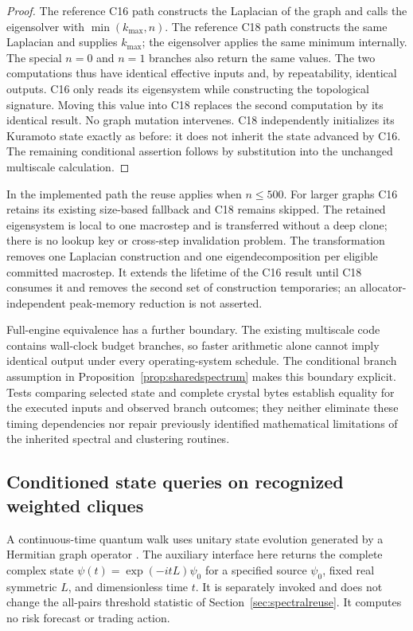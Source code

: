 \documentclass[11pt,a4paper]{article}
\theoremstyle{definition}\newtheorem{definition}[theorem]{Definition}
\begin{document}
\begin{proof}
The reference C16 path constructs the Laplacian of the graph and calls the
eigensolver with $\min(k_{\max},n)$.  The reference C18 path constructs the
same Laplacian and supplies $k_{\max}$; the eigensolver applies the same minimum
internally.  The special $n=0$ and $n=1$ branches also return the same values.
The two computations thus have identical effective inputs and, by
repeatability, identical outputs.  C16 only reads its eigensystem while
constructing the topological signature.  Moving this value into C18 replaces
the second computation by its identical result.  No graph mutation intervenes.
C18 independently initializes its Kuramoto state exactly as before: it does
not inherit the state advanced by C16.  The remaining conditional assertion
follows by substitution into the unchanged multiscale calculation.
\end{proof}

In the implemented path the reuse applies when $n\leq500$.  For larger graphs
C16 retains its existing size-based fallback and C18 remains skipped.  The
retained eigensystem is local to one macrostep and is transferred without a
deep clone; there is no lookup key or cross-step invalidation problem.  The
transformation removes one Laplacian construction and one eigendecomposition
per eligible committed macrostep.  It extends the lifetime of the C16 result
until C18 consumes it and removes the second set of construction temporaries;
an allocator-independent peak-memory reduction is not asserted.

Full-engine equivalence has a further boundary.  The existing multiscale code
contains wall-clock budget branches, so faster arithmetic alone cannot imply
identical output under every operating-system schedule.  The conditional
branch assumption in Proposition~\ref{prop:sharedspectrum} makes this boundary
explicit.  Tests comparing selected state and complete crystal bytes establish
equality for the executed inputs and observed branch outcomes; they neither
eliminate these timing dependencies nor repair previously identified
mathematical limitations of the inherited spectral and clustering routines.

\subsection{Conditioned state queries on recognized weighted cliques}
\label{sec:conditionedwalk}
A continuous-time quantum walk uses unitary state evolution generated by a
Hermitian graph operator \cite{farhigutmann1998}. The auxiliary interface here
returns the complete complex state $\psi(t)=\exp(-itL)\psi_0$ for a specified
source $\psi_0$, fixed real symmetric $L$, and dimensionless time $t$. It is
separately invoked and does not change the all-pairs threshold statistic of
Section~\ref{sec:spectralreuse}. It computes no risk forecast or trading action.
\end{document}
